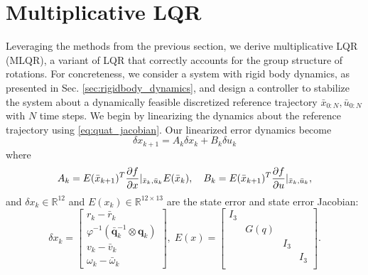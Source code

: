 \documentclass{svproc}
\newcommand{\R}{\mathbb{R}}
\newcommand{\q}{\textbf{q}}
\begin{document}
\section{Multiplicative LQR} \label{sec:MLQR}
    Leveraging the methods from the previous section, we derive multiplicative LQR (MLQR), a variant of LQR that correctly accounts for the group structure of rotations. For concreteness, we consider a system with rigid body dynamics, as presented in Sec. \ref{sec:rigidbody_dynamics}, and design a controller to stabilize the system about a dynamically feasible discretized reference trajectory $\bar{x}_{0:N}, \bar{u}_{0:N}$ with $N$ time steps. 
    We begin by linearizing the dynamics about the reference trajectory using \eqref{eq:quat_jacobian}. Our linearized error dynamics become
    \begin{equation} \label{eq:linearized_dynamics}
        \delta x_{k+1} = A_k \delta x_k + B_k \delta u_k 
    \end{equation}
    where \begin{equation}
        A_k = E(\bar{x}_{k+1})^T \pdv{f}{x}|_{\bar{x}_k,\bar{u}_k} E(\bar{x}_k), \quad
        B_k = E(\bar{x}_{k+1})^T \pdv{f}{u}|_{\bar{x}_k,\bar{u}_k},
    \end{equation}
    and $\delta x_k \in \R^{12}$ and $E(x_k) \in \R^{12 \times 13}$ are the state error and state error Jacobian:
    \begin{equation} \label{eq:state_error}
        \delta x_k = \begin{bmatrix} 
            r_k - \bar{r}_k \\ \varphi^{-1}(\bar{\q}_k^{-1} \otimes \q_k) \\ v_k - \bar{v}_k \\ \omega_k - \bar{\omega}_k 
        \end{bmatrix}, \; 
        E(x) = \begin{bmatrix}
            I_3 & & & \\
            & G(q) & & \\
            & & I_3 & \\
            & & & I_3 \\
        \end{bmatrix}.
    \end{equation}
    
\end{document}
